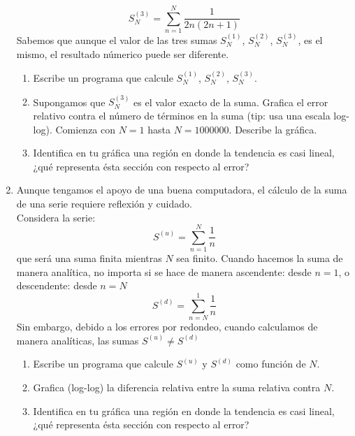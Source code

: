 \documentclass[12pt]{article}
\begin{document}
\begin{enumerate}
\begin{equation}
S^{(3)}_{N}=  \sum^{N}_{n=1} \dfrac{1}{2n(2n+1)}
\end{equation}
Sabemos que aunque el valor de las tres sumas $S^{(1)}_{N}$, $S^{(2)}_{N}$, $S^{(3)}_{N}$, es el mismo, el resultado númerico puede ser diferente.
\begin{enumerate}
\item Escribe un programa que calcule $S^{(1)}_{N}$, $S^{(2)}_{N}$, $S^{(3)}_{N}$.
\item Supongamos que $S^{(3)}_{N}$ es el valor exacto de la suma. Grafica el error relativo contra el número de términos en la suma (tip: usa una escala log-log). Comienza con $N=1$ hasta $N=1000000$. Describe la gráfica.
\item Identifica en tu gráfica una región en donde la tendencia es casi lineal, ¿qué representa ésta sección con respecto al error?
\end{enumerate}
\item Aunque tengamos el apoyo de una buena computadora, el cálculo de la suma de una serie requiere reflexión y cuidado.
\\
Considera la serie:
\[S^{(u)} = \sum_{n=1}^{N} \dfrac{1}{n} \]
que será una suma finita mientras $N$ sea finito. Cuando hacemos la suma de manera analítica, no importa si se hace de manera ascendente: desde $n=1$, o descendente: desde $n=N$
\[S^{(d)} = \sum_{n=N}^{1} \dfrac{1}{n} \]
Sin embargo, debido a los errores por redondeo, cuando calculamos de manera analíticas, las sumas $S^{(u)} \neq S^{(d)}$
\begin{enumerate}
\item Escribe un programa que calcule $S^{(u)}$ y $S^{(d)}$ como función de  $N$.
\item Grafica (log-log) la diferencia relativa entre la suma relativa contra $N$.
\item Identifica en tu gráfica una región en donde la tendencia es casi lineal, ¿qué representa ésta sección con respecto al error?
\end{enumerate}
\end{enumerate}
\end{document}
